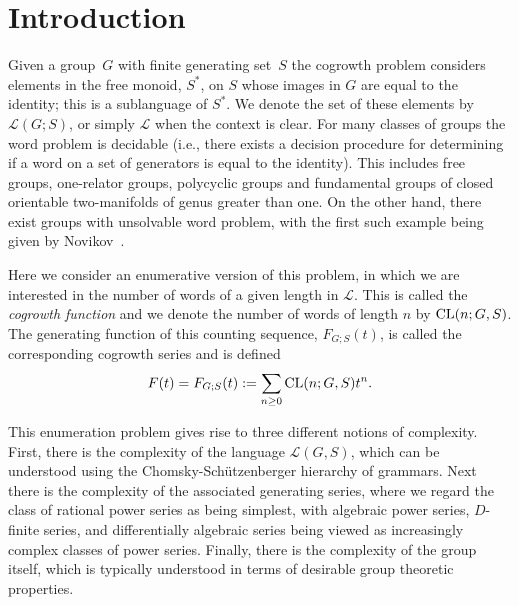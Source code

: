 \documentclass[11pt]{amsart}
\theoremstyle{definition}
\begin{document}
\section{Introduction}
\label{sec:Intro}
 Given a group~$G$ with finite generating set~$S$ the
cogrowth problem considers elements in the free monoid, $S^*$, on $S$ whose images in $G$ are
equal to the identity; this is a sublanguage of $S^*$. We denote the
set of these elements by 
$\mathcal{L}(G;S)$, or simply $\mathcal{L}$ when the context is clear. For many classes of groups the word problem is decidable
(i.e., there exists a decision procedure for determining if a word on
a set of generators is equal to the identity). This includes free
groups, one-relator groups, polycyclic groups and fundamental groups
of closed orientable two-manifolds of genus greater than one. On the
other hand, there exist groups with unsolvable word problem, with the
first such example being given by Novikov~\cite{novikov}. 


Here we consider an enumerative version of this problem, in which we are interested in
the number of words of a given length in $\mathcal{L}$. This is called
the \emph{cogrowth function} and we denote the number of words of length $n$
by  ${\rm CL}(n;G,S)$. The generating function of this counting
sequence,  $F_{G;S}(t)$, is called the
corresponding cogrowth series and is defined \begin{equation}
F(t)= F_{G;S}(t) :=
  \sum_{n\ge0} {\rm CL}(n;G,S)t^n.\end{equation}
  
This enumeration problem gives rise to three different notions of complexity. First, there is the complexity of the language $\mathcal{L}(G,S)$, which can be understood using the Chomsky-Sch\"utzenberger hierarchy of grammars. Next there is the complexity of the associated generating series, where we regard the class of rational power series as being simplest, with algebraic power series, $D$-finite series, and differentially algebraic series being viewed as increasingly complex classes of power series. Finally, there is the complexity of the group itself, which is typically understood in terms of desirable group theoretic properties.
\end{document}

